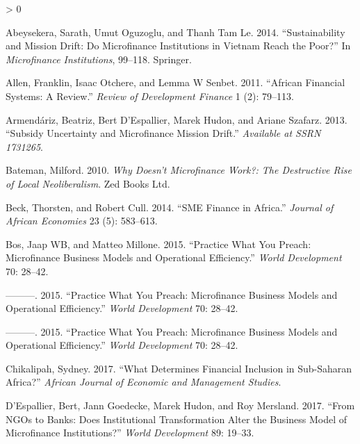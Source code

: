 \documentclass[
]{article}
\newlength{\cslhangindent}
\newenvironment{CSLReferences}[2] %
 {%
  \setlength{\parindent}{0pt}
  \ifodd #1 \everypar{\setlength{\hangindent}{\cslhangindent}}\ignorespaces\fi
  \ifnum #2 > 0
  \setlength{\parskip}{#2\baselineskip}
  \fi
 }%
 {}
\begin{document}
\hypertarget{refs}{}
\begin{CSLReferences}{1}{0}
\leavevmode\hypertarget{ref-abeysekera2014sustainability}{}%
Abeysekera, Sarath, Umut Oguzoglu, and Thanh Tam Le. 2014.
{``Sustainability and Mission Drift: Do Microfinance Institutions in
Vietnam Reach the Poor?''} In \emph{Microfinance Institutions}, 99--118.
Springer.

\leavevmode\hypertarget{ref-allen2011african}{}%
Allen, Franklin, Isaac Otchere, and Lemma W Senbet. 2011. {``African
Financial Systems: A Review.''} \emph{Review of Development Finance} 1
(2): 79--113.

\leavevmode\hypertarget{ref-armendariz2013subsidy}{}%
Armendáriz, Beatriz, Bert D'Espallier, Marek Hudon, and Ariane Szafarz.
2013. {``Subsidy Uncertainty and Microfinance Mission Drift.''}
\emph{Available at SSRN 1731265}.

\leavevmode\hypertarget{ref-bateman2010doesn}{}%
Bateman, Milford. 2010. \emph{Why Doesn't Microfinance Work?: The
Destructive Rise of Local Neoliberalism}. Zed Books Ltd.

\leavevmode\hypertarget{ref-beck2014sme}{}%
Beck, Thorsten, and Robert Cull. 2014. {``SME Finance in Africa.''}
\emph{Journal of African Economies} 23 (5): 583--613.

\leavevmode\hypertarget{ref-bos2015practice}{}%
Bos, Jaap WB, and Matteo Millone. 2015. {``Practice What You Preach:
Microfinance Business Models and Operational Efficiency.''} \emph{World
Development} 70: 28--42.

\leavevmode\hypertarget{ref-bos2015practice}{}%
---------. 2015. {``Practice What You Preach: Microfinance Business
Models and Operational Efficiency.''} \emph{World Development} 70:
28--42.

\leavevmode\hypertarget{ref-bos2015practice}{}%
---------. 2015. {``Practice What You Preach: Microfinance Business
Models and Operational Efficiency.''} \emph{World Development} 70:
28--42.

\leavevmode\hypertarget{ref-chikalipah2017determines}{}%
Chikalipah, Sydney. 2017. {``What Determines Financial Inclusion in
Sub-Saharan Africa?''} \emph{African Journal of Economic and Management
Studies}.

\leavevmode\hypertarget{ref-d2017ngos}{}%
D'Espallier, Bert, Jann Goedecke, Marek Hudon, and Roy Mersland. 2017.
{``From NGOs to Banks: Does Institutional Transformation Alter the
Business Model of Microfinance Institutions?''} \emph{World Development}
89: 19--33.


\end{CSLReferences}
\end{document}
